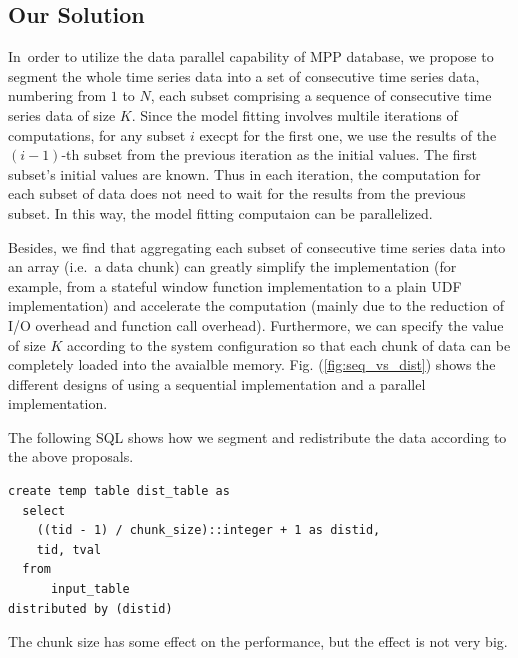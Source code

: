 \documentclass[english,10pt]{llncs}
\begin{document}
\subsection{Our Solution}


In\ order to utilize the data parallel capability of MPP database, we
propose to segment the whole time series data into a set of
consecutive time series data, numbering from $1$ to $N$, each subset
comprising a sequence of consecutive time series data of size
$K$. Since the model fitting involves multile iterations of
computations, for any subset $i$ execpt for the first one, we use the
results of the $(i-1)$-th subset from the previous iteration as the
initial values. The first subset's initial values are known. Thus in
each iteration, the computation for each subset of data does not need
to wait for the results from the previous subset. In this way, the
model fitting computaion can be parallelized. 

Besides, we find that aggregating each subset of consecutive time
series data into an array (i.e.\ a data chunk) can greatly simplify
the implementation (for example, from a stateful window function
implementation to a plain UDF implementation) and accelerate the
computation (mainly due to the reduction of I/O overhead and function
call overhead). Furthermore, we can specify the value of size $K$
according to the system configuration so that each chunk of data can
be completely loaded into the avaialble
memory. Fig. (\ref{fig:seq_vs_dist}) shows the different designs of
using a sequential implementation and a parallel implementation. 

The following SQL shows how we segment and redistribute the data
according to the above proposals.

\begin{verbatim}
create temp table dist_table as
  select
    ((tid - 1) / chunk_size)::integer + 1 as distid, 
    tid, tval
  from 
      input_table
distributed by (distid)
\end{verbatim}

The chunk size has some effect on the performance, but the effect is
not very big. 
\end{document}
